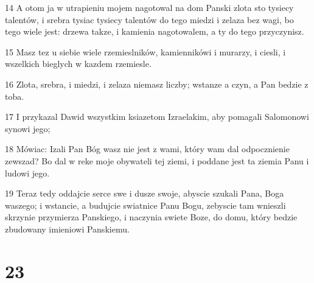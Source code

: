 \par 14 A otom ja w utrapieniu mojem nagotowal na dom Panski zlota sto tysiecy talentów, i srebra tysiac tysiecy talentów do tego miedzi i zelaza bez wagi, bo tego wiele jest: drzewa takze, i kamienia nagotowalem, a ty do tego przyczynisz.
\par 15 Masz tez u siebie wiele rzemieslników, kamiennikówi i murarzy, i ciesli, i wszelkich bieglych w kazdem rzemiesle.
\par 16 Zlota, srebra, i miedzi, i zelaza niemasz liczby; wstanze a czyn, a Pan bedzie z toba.
\par 17 I przykazal Dawid wszystkim ksiazetom Izraelakim, aby pomagali Salomonowi synowi jego;
\par 18 Mówiac: Izali Pan Bóg wasz nie jest z wami, który wam dal odpocznienie zewszad? Bo dal w reke moje obywateli tej ziemi, i poddane jest ta ziemia Panu i ludowi jego.
\par 19 Teraz tedy oddajcie serce swe i dusze swoje, abyscie szukali Pana, Boga waszego; i wstancie, a budujcie swiatnice Panu Bogu, zebyscie tam wnieszli skrzynie przymierza Panskiego, i naczynia swiete Boze, do domu, który bedzie zbudowany imieniowi Panskiemu.

\chapter{23}

